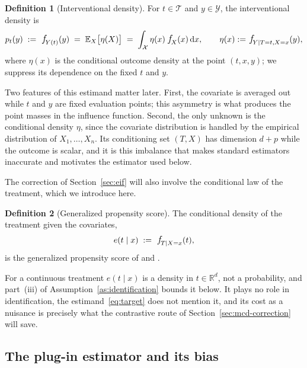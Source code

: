 \documentclass[11pt]{article}
\theoremstyle{plain}
\theoremstyle{definition}
\newtheorem{mydef}{Definition}
\theoremstyle{remark}
\newcommand{\pE}{\ensuremath{\mathbb{E}}}
\newcommand{\R}{\mathbb{R}}
\newcommand{\cX}{\ensuremath{\mathcal{X}}}
\newcommand{\cY}{\ensuremath{\mathcal{Y}}}
\newcommand{\cT}{\ensuremath{\mathcal{T}}}
\newcommand{\pf}[1]{\ensuremath{\,\mathlarger{\textit{f}}_{#1}}}
\newcommand{\dd}{\,\mathrm{d}}
\newcommand{\gps}{e}
\begin{document}
\begin{mydef}[Interventional density]
\label{def:target}
For $t \in \cT$ and $y \in \cY$, the interventional density is
\begin{equation}
p_t(y) \;:=\; \pf{Y(t)}(y) \;=\; \pE_X\big[\eta(X)\big]
\;=\; \int_{\cX} \eta(x)\,\pf{X}(x) \dd x ,
\qquad
\eta(x) := \pf{Y \mid T=t,X=x}(y),
\label{eq:target}
\end{equation}
where $\eta(x)$ is the conditional outcome density at the point $(t,x,y)$; we suppress its
dependence on the fixed $t$ and $y$.
\end{mydef}

Two features of this estimand matter later. First, the covariate is averaged out while $t$ and
$y$ are fixed evaluation points; this asymmetry is what produces the point masses in the
influence function. Second, the only unknown is the conditional density $\eta$, since the
covariate distribution is handled by the empirical distribution of $X_1,\dots,X_n$. Its
conditioning set $(T,X)$ has dimension $d+p$ while the outcome is scalar, and it is this
imbalance that makes standard estimators inaccurate and motivates the estimator used below.

The correction of Section~\ref{sec:eif} will also involve the conditional law of the
treatment, which we introduce here.

\begin{mydef}[Generalized propensity score]
\label{def:gps}
The conditional density of the treatment given the covariates,
\begin{equation}
\gps(t \mid x) \;:=\; \pf{T \mid X=x}(t),
\label{eq:gps}
\end{equation}
is the generalized propensity score of \citet{imbens2000} and \citet{hirano2004}.
\end{mydef}

For a continuous treatment $\gps(t\mid x)$ is a density in $t \in \R^{d}$, not a probability,
and part~(iii) of Assumption~\ref{as:identification} bounds it below. It plays no role in
identification, the estimand~\eqref{eq:target} does not mention it, and its cost as a
nuisance is precisely what the contrastive route of Section~\ref{sec:mcd-correction} will save.

\subsection{The plug-in estimator and its bias}
\label{sec:setting-plugin}
\end{document}
